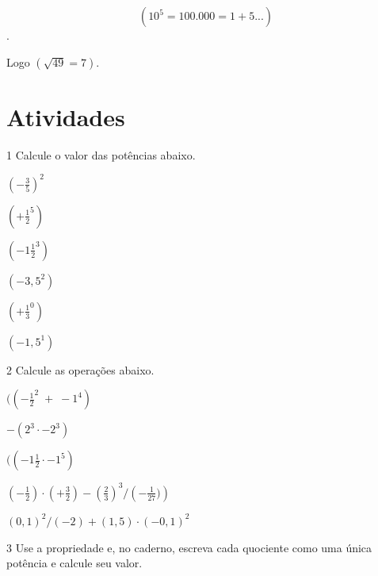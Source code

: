  $$(10^5 = 100.000 = 1 + 5...)$$. 

 Logo $(\sqrt{49} = 7)$.



\section{Atividades}

\num{1} Calcule o valor das potências abaixo.

\begin{escolha}
\item $\left( - \frac{3}{5}\right )^2$  
\item $( + \frac{1}{2}^5)$  
\item $( - 1\frac{1}{2}^3)$  
\item $( -3,5^2)$  
\item $( + \frac{1}{3}^0)$  
\item $(-1,5^1)$  
\end{escolha}


\num{2} Calcule as operações abaixo.

\begin{escolha}
\item $(( - \frac{1}{2}^2 \; + \; -1^4)$ 
\item $ - (2^3 \cdot -2^3)$ 
\item $(( - 1\frac{1}{2} \cdot -1^5)$ 
\item $\left ( - \frac{1}{2} \right) \cdot \left( + \frac{3}{2} \right) - \left ( \frac{2}{3} \right)^{3} / \left ( - \frac{1}{27}) \right)$  
\item $(0,1) ^2 / (-2) + (1,5) \cdot (-0,1)^2$ 
\end{escolha}







\num{3} Use a propriedade e, no caderno, escreva cada quociente como uma
única potência e calcule seu valor.


